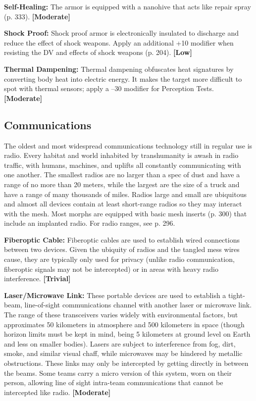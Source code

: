 \textbf{Self-Healing:} The armor is equipped with a nanohive
that acts like repair spray (p. 333). \textbf{[Moderate]}

\textbf{Shock Proof:} Shock proof armor is electronically 
insulated to discharge and reduce the effect of shock 
weapons. Apply an additional +10 modifier when resisting
the DV and effects of shock weapons (p. 204). \textbf{[Low]}

\textbf{Thermal Dampening:} Thermal dampening obfuscates
heat signatures by converting body heat into
electric energy. It makes the target more difficult to 
spot with thermal sensors; apply a –30 modifier for 
Perception Tests. \textbf{[Moderate]}

\subsection{Communications}

The oldest and most widespread communications 
technology still in regular use is radio. Every habitat 
and world inhabited by transhumanity is awash in 
radio traffic, with humans, machines, and uplifts all 
constantly communicating with one another. The 
smallest radios are no larger than a spec of dust and 
have a range of no more than 20 meters, while the 
largest are the size of a truck and have a range of 
many thousands of miles. Radios large and small are 
ubiquitous and almost all devices contain at least 
short-range radios so they may interact with the 
mesh. Most morphs are equipped with basic mesh 
inserts (p. 300) that include an implanted radio. For 
radio ranges, see p. 296.

\textbf{Fiberoptic Cable:} Fiberoptic cables are used to 
establish wired connections between two devices. 
Given the ubiquity of radios and the tangled mess 
wires cause, they are typically only used for privacy 
(unlike radio communication, fiberoptic signals may 
not be intercepted) or in areas with heavy radio 
interference. \textbf{[Trivial]}

\textbf{Laser/Microwave Link:} These portable devices are 
used to establish a tight-beam, line-of-sight communications
channel with another laser or microwave
link. The range of these transceivers varies widely 
with environmental factors, but approximates 50 
kilometers in atmosphere and 500 kilometers in 
space (though horizon limits must be kept in mind, 
being 5 kilometers at ground level on Earth and less 
on smaller bodies). Lasers are subject to interference 
from fog, dirt, smoke, and similar visual chaff, while 
microwaves may be hindered by metallic obstructions. 
These links may only be intercepted by getting directly 
in between the beams. Some teams carry a micro version
of this system, worn on their person, allowing
line of sight intra-team communications that cannot 
be intercepted like radio. \textbf{[Moderate]}

